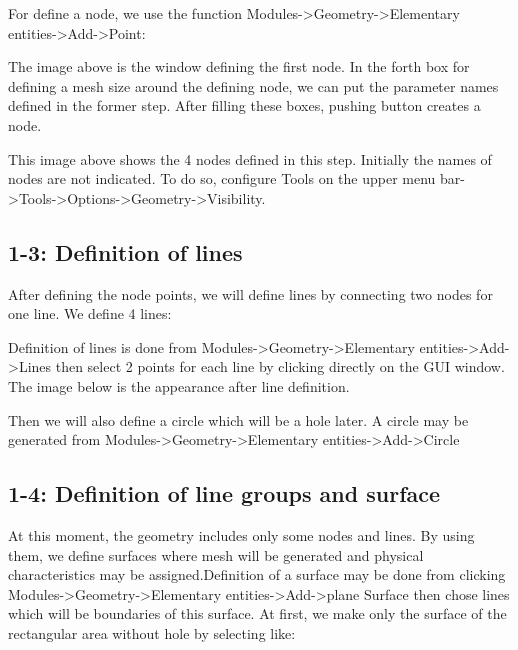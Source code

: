 \documentclass[letterpaper,10pt,english]{sphinxmanual}
\begin{document}
For define a node, we use the function Modules-\textgreater{}Geometry-\textgreater{}Elementary entities-\textgreater{}Add-\textgreater{}Point:



The image above is the window defining the first node. In the forth box for defining a mesh size around the defining node, we can put the parameter names defined in the former step. After filling these boxes, pushing  button creates a node.



This image above shows the 4 nodes defined in this step. Initially the names of nodes are not indicated. To do so, configure Tools on the upper menu bar-\textgreater{}Tools-\textgreater{}Options-\textgreater{}Geometry-\textgreater{}Visibility.


\subsection{1-3: Definition of lines}
\label{\detokenize{meshing:definition-of-lines}}
After defining the node points, we will define lines by connecting two nodes for one line. We define 4 lines:

\begin{sphinxVerbatim}[commandchars=\\\{\}]
     
     
     
     
\end{sphinxVerbatim}

Definition of lines is done from Modules-\textgreater{}Geometry-\textgreater{}Elementary entities-\textgreater{}Add-\textgreater{}Lines then select 2 points for each line by clicking directly on the GUI window. The image below is the appearance after line definition.



Then we will also define a circle which will be a hole later. A circle may be generated from Modules-\textgreater{}Geometry-\textgreater{}Elementary entities-\textgreater{}Add-\textgreater{}Circle




\subsection{1-4: Definition of line groups and surface}
\label{\detokenize{meshing:definition-of-line-groups-and-surface}}
At this moment, the geometry includes only some nodes and lines. By using them, we define surfaces where mesh will be generated and physical characteristics may be assigned.Definition of a surface may be done from clicking Modules-\textgreater{}Geometry-\textgreater{}Elementary entities-\textgreater{}Add-\textgreater{}plane Surface then chose lines which will be boundaries of this surface.
At first, we make only the surface of the rectangular area without hole by selecting like:
\end{document}
